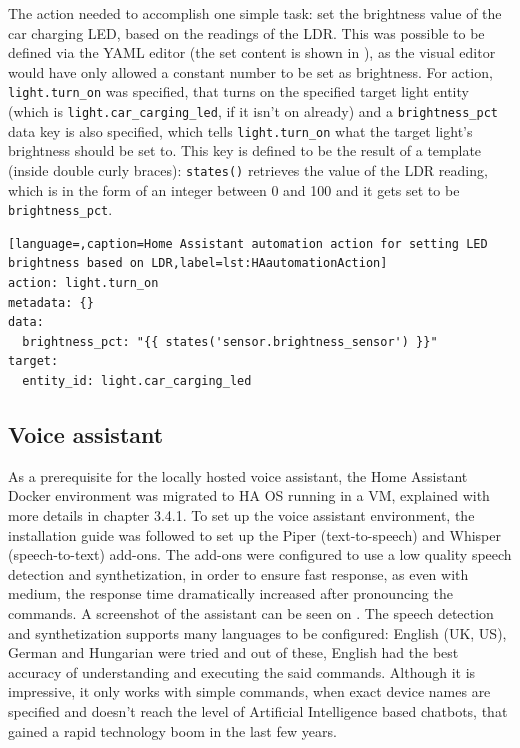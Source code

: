 The action needed to accomplish one simple task: set the brightness value of the car charging LED, based on the readings of the LDR. This was possible to be defined via the YAML editor (the set content is shown in ), as the visual editor would have only allowed a constant number to be set as brightness. For action, \verb+light.turn_on+ was specified, that turns on the specified target light entity (which is \verb+light.car_carging_led+, if it isn't on already) and a \verb+brightness_pct+ data key is also specified, which tells \verb+light.turn_on+ what the target light's brightness should be set to. This key is defined to be the result of a template (inside double curly braces): \verb+states()+ retrieves the value of the LDR reading, which is in the form of an integer between 0 and 100 and it gets set to be \verb+brightness_pct+.

\begin{lstlisting}[language=,caption=Home Assistant automation action for setting LED brightness based on LDR,label=lst:HAautomationAction]
action: light.turn_on
metadata: {}
data:
  brightness_pct: "{{ states('sensor.brightness_sensor') }}"
target:
  entity_id: light.car_carging_led  
\end{lstlisting}
\break

\subsection{Voice assistant}

As a prerequisite for the locally hosted voice assistant, the Home Assistant Docker environment was migrated to HA OS running in a VM, explained with more details in chapter 3.4.1. To set up the voice assistant environment, the installation guide was followed to set up the Piper (text-to-speech) and Whisper (speech-to-text) add-ons. \cite{HALocalAssist} The add-ons were configured to use a low quality speech detection and synthetization, in order to ensure fast response, as even with medium, the response time dramatically increased after pronouncing the commands. A screenshot of the assistant can be seen on . The speech detection and synthetization supports many languages to be configured: English (UK, US), German and Hungarian were tried and out of these, English had the best accuracy of understanding and executing the said commands. Although it is impressive, it only works with simple commands, when exact device names are specified and doesn't reach the level of Artificial Intelligence based chatbots, that gained a rapid technology boom in the last few years.

